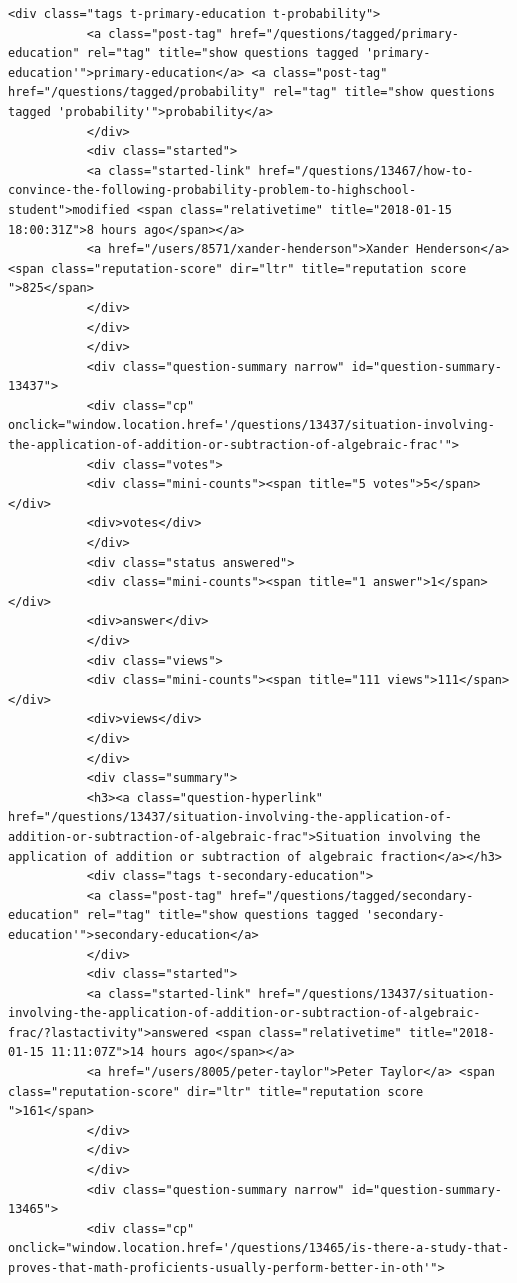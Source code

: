 \documentclass[11pt]{article}
\begin{document}
\begin{Verbatim}[commandchars=\\\{\}]
           <div class="tags t-primary-education t-probability">
           <a class="post-tag" href="/questions/tagged/primary-education" rel="tag" title="show questions tagged 'primary-education'">primary-education</a> <a class="post-tag" href="/questions/tagged/probability" rel="tag" title="show questions tagged 'probability'">probability</a>
           </div>
           <div class="started">
           <a class="started-link" href="/questions/13467/how-to-convince-the-following-probability-problem-to-highschool-student">modified <span class="relativetime" title="2018-01-15 18:00:31Z">8 hours ago</span></a>
           <a href="/users/8571/xander-henderson">Xander Henderson</a> <span class="reputation-score" dir="ltr" title="reputation score ">825</span>
           </div>
           </div>
           </div>
           <div class="question-summary narrow" id="question-summary-13437">
           <div class="cp" onclick="window.location.href='/questions/13437/situation-involving-the-application-of-addition-or-subtraction-of-algebraic-frac'">
           <div class="votes">
           <div class="mini-counts"><span title="5 votes">5</span></div>
           <div>votes</div>
           </div>
           <div class="status answered">
           <div class="mini-counts"><span title="1 answer">1</span></div>
           <div>answer</div>
           </div>
           <div class="views">
           <div class="mini-counts"><span title="111 views">111</span></div>
           <div>views</div>
           </div>
           </div>
           <div class="summary">
           <h3><a class="question-hyperlink" href="/questions/13437/situation-involving-the-application-of-addition-or-subtraction-of-algebraic-frac">Situation involving the application of addition or subtraction of algebraic fraction</a></h3>
           <div class="tags t-secondary-education">
           <a class="post-tag" href="/questions/tagged/secondary-education" rel="tag" title="show questions tagged 'secondary-education'">secondary-education</a>
           </div>
           <div class="started">
           <a class="started-link" href="/questions/13437/situation-involving-the-application-of-addition-or-subtraction-of-algebraic-frac/?lastactivity">answered <span class="relativetime" title="2018-01-15 11:11:07Z">14 hours ago</span></a>
           <a href="/users/8005/peter-taylor">Peter Taylor</a> <span class="reputation-score" dir="ltr" title="reputation score ">161</span>
           </div>
           </div>
           </div>
           <div class="question-summary narrow" id="question-summary-13465">
           <div class="cp" onclick="window.location.href='/questions/13465/is-there-a-study-that-proves-that-math-proficients-usually-perform-better-in-oth'">

\end{Verbatim}
\end{document}

